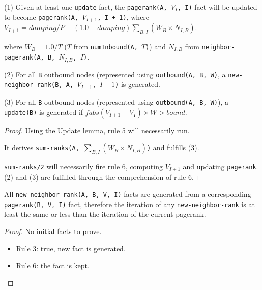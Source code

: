 \begin{lemma}
(1) Given at least one \texttt{update} fact, the \texttt{pagerank(A, $V_{I}$,
I)} fact will be updated to become \texttt{pagerank(A, $V_{I + 1}$, I +
1)}, where \texttt{$V_{I + 1} = damping / P + (1.0 - damping)\sum_{B,
I} (W_{B} \times  N_{I,B})$}.

where $W_B = 1.0/T$ ($T$ from \texttt{\bang numInbound(A, $T$)})
and $N_{I,B}$ from \texttt{neighbor-pagerank(A, B, $N_{I, B}$, $I$)}.

(2) For all \texttt{B} outbound nodes (represented using \texttt{\bang outbound(A, B,
W)}, a \texttt{new-neighbor-rank(B, A, $V_{I+1}$, $I + 1$)} is generated.

(3) For all \texttt{B} outbound nodes (represented using \texttt{\bang outbound(A, B,
W)}), a \texttt{update(B)} is generated if 
$fabs(V_{I + 1} - V_{I}) \times W > bound$.
\end{lemma}
\begin{proof}
Using the Update lemma, rule 5 will necessarily run.

It derives \texttt{sum-ranks(A, $\sum_{B, I} (W_B \times N_{I,B})$)} and
fulfills (3).

\texttt{sum-ranks/2} will necessarily fire rule 6,
computing $V_{I+1}$ and updating \texttt{pagerank}. (2) and (3) are fulfilled
through the comprehension of rule 6.
\end{proof}

\begin{invariant}
All \texttt{new-neighbor-rank(A, B, V, I)} facts are generated from a corresponding
\texttt{pagerank(B, V, I)} fact, therefore the iteration of any
\texttt{new-neighbor-rank} is at least the same or less than the iteration of
the current pagerank.
\end{invariant}
\begin{proof}
No initial facts to prove.

\begin{itemize}
   \item Rule 3: true, new fact is generated.
   \item Rule 6: the fact is kept.
\end{itemize}
\end{proof}


